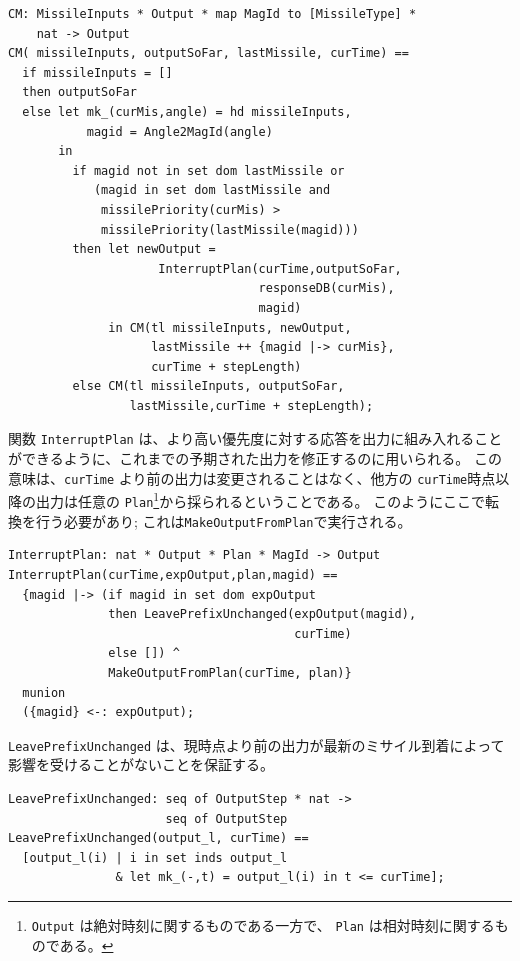 \documentclass[\pformat,12pt]{jreport}
\begin{document}
\begin{lstlisting}
CM: MissileInputs * Output * map MagId to [MissileType] * 
    nat -> Output
CM( missileInputs, outputSoFar, lastMissile, curTime) ==
  if missileInputs = []
  then outputSoFar
  else let mk_(curMis,angle) = hd missileInputs,
           magid = Angle2MagId(angle)
       in
         if magid not in set dom lastMissile or
            (magid in set dom lastMissile and
             missilePriority(curMis) > 
             missilePriority(lastMissile(magid)))
         then let newOutput = 
                     InterruptPlan(curTime,outputSoFar,
                                   responseDB(curMis),
                                   magid)
              in CM(tl missileInputs, newOutput, 
                    lastMissile ++ {magid |-> curMis},
                    curTime + stepLength)
         else CM(tl missileInputs, outputSoFar, 
                 lastMissile,curTime + stepLength);
\end{lstlisting}

関数 \texttt{InterruptPlan} は、より高い優先度に対する応答を出力に組み入れることができるように、これまでの予期された出力を修正するのに用いられる。
この意味は、\texttt{curTime} より前の出力は変更されることはなく、他方の \texttt{curTime}時点以降の出力は任意の \texttt{Plan}\footnote{\texttt{Output} は絶対時刻に関するものである一方で、 \texttt{Plan} は相対時刻に関するものである。}から採られるということである。
このようにここで転換を行う必要があり; これは\texttt{MakeOutputFromPlan}で実行される。

\begin{lstlisting}
InterruptPlan: nat * Output * Plan * MagId -> Output
InterruptPlan(curTime,expOutput,plan,magid) ==
  {magid |-> (if magid in set dom expOutput
              then LeavePrefixUnchanged(expOutput(magid), 
                                        curTime)
              else []) ^
              MakeOutputFromPlan(curTime, plan)} 
  munion
  ({magid} <-: expOutput);
\end{lstlisting}

\texttt{LeavePrefixUnchanged} は、現時点より前の出力が最新のミサイル到着によって影響を受けることがないことを保証する。

\begin{lstlisting}
LeavePrefixUnchanged: seq of OutputStep * nat -> 
                      seq of OutputStep
LeavePrefixUnchanged(output_l, curTime) ==
  [output_l(i) | i in set inds output_l
               & let mk_(-,t) = output_l(i) in t <= curTime];
\end{lstlisting}
\end{document}
